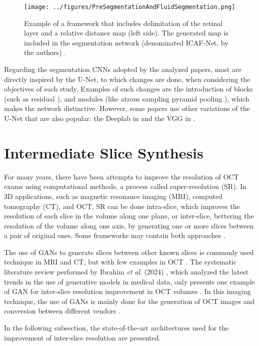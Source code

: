 \par
\begin{figure}[!ht]
	\centering
	\texttt{[image: ../figures/PreSegmentationAndFluidSegmentation.png]}
	\caption{Example of a framework that includes delimitation of the retinal layer and a relative distance map (left side). The generated map is included in the segmentation network (denominated ICAF-Net, by the authors) \cite{Tang2022}.}
	\label{fig:PreSegmentationAndFluidSegmentation}
\end{figure}
\par
Regarding the segmentation CNNs adopted by the analyzed papers, most are directly inspired by the U-Net, to which changes are done, when considering the objectives of each study. Examples of such changes are the introduction of blocks (such as residual \cite{Mantel2021, Zhang2023, Liu2024, Hassan2021b, Hassan2021a, Padilla2022}), and modules (like atrous sampling pyramid pooling \cite{Hassan2021b, Hassan2021a, Hu2019, Sappa2021}), which makes the network distinctive. However, some papers use other variations of the U-Net that are also popular: the Deeplab \cite{LChen2018} in \cite{Hassan2021a, Li2023} and the VGG \cite{Simonyan2014} in \cite{Padilla2022, Hassan2021b}.

\section{Intermediate Slice Synthesis}
For many years, there have been attempts to improve the resolution of OCT exams using computational methods, a process called super-resolution (SR). In 3D applications, such as magnetic resonance imaging (MRI), computed tomography (CT), and OCT, SR can be done intra-slice, which improves the resolution of each slice in the volume along one plane, or inter-slice, bettering the resolution of the volume along one axis, by generating one or more slices between a pair of original ones. Some frameworks may contain both approaches \cite{You2020}.
\par
The use of GANs to generate slices between other known slices is commonly used technique in MRI and CT, but with few examples in OCT \cite{You2020}. The systematic literature review performed by Ibrahim \textit{et al}. (2024) \cite{Ibrahim2024}, which analyzed the latest trends in the use of generative models in medical data, only presents one example of GAN for inter-slice resolution improvement in OCT volumes \cite{Lopez2023}. In this imaging technique, the use of GANs is mainly done for the generation of OCT images and conversion between different vendors \cite{Ibrahim2024}.
\par
In the following subsection, the state-of-the-art architectures used for the improvement of inter-slice resolution are presented.

